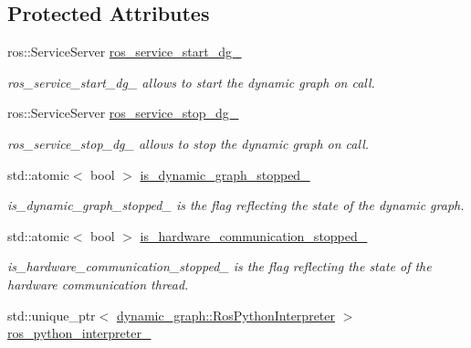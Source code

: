 \subsection*{Protected Attributes}
\begin{DoxyCompactItemize}
\item 
ros\+::\+Service\+Server \hyperlink{classdynamic__graph_1_1DynamicGraphManager_adb99ba3a7a5e677b30531a69bcc922ec}{ros\+\_\+service\+\_\+start\+\_\+dg\+\_\+}
\begin{DoxyCompactList}\small\item\em ros\+\_\+service\+\_\+start\+\_\+dg\+\_\+ allows to start the dynamic graph on call. \end{DoxyCompactList}\item 
ros\+::\+Service\+Server \hyperlink{classdynamic__graph_1_1DynamicGraphManager_adf973b6da4e4fe14cae262ba94ebb191}{ros\+\_\+service\+\_\+stop\+\_\+dg\+\_\+}
\begin{DoxyCompactList}\small\item\em ros\+\_\+service\+\_\+stop\+\_\+dg\+\_\+ allows to stop the dynamic graph on call. \end{DoxyCompactList}\item 
std\+::atomic$<$ bool $>$ \hyperlink{classdynamic__graph_1_1DynamicGraphManager_a87baafbaadf396a7663da653dc5da106}{is\+\_\+dynamic\+\_\+graph\+\_\+stopped\+\_\+}
\begin{DoxyCompactList}\small\item\em is\+\_\+dynamic\+\_\+graph\+\_\+stopped\+\_\+ is the flag reflecting the state of the dynamic graph. \end{DoxyCompactList}\item 
std\+::atomic$<$ bool $>$ \hyperlink{classdynamic__graph_1_1DynamicGraphManager_ab1a2bc0a8f04126638056f430297097e}{is\+\_\+hardware\+\_\+communication\+\_\+stopped\+\_\+}
\begin{DoxyCompactList}\small\item\em is\+\_\+hardware\+\_\+communication\+\_\+stopped\+\_\+ is the flag reflecting the state of the hardware communication thread. \end{DoxyCompactList}\item 
\mbox{\label{classdynamic__graph_1_1DynamicGraphManager_a40458dd801d1ee7e2051f8b8fab5366b}} 
std\+::unique\+\_\+ptr$<$ \hyperlink{classdynamic__graph_1_1RosPythonInterpreter}{dynamic\+\_\+graph\+::\+Ros\+Python\+Interpreter} $>$ \hyperlink{classdynamic__graph_1_1DynamicGraphManager_a40458dd801d1ee7e2051f8b8fab5366b}{ros\+\_\+python\+\_\+interpreter\+\_\+}

\end{DoxyCompactItemize}
